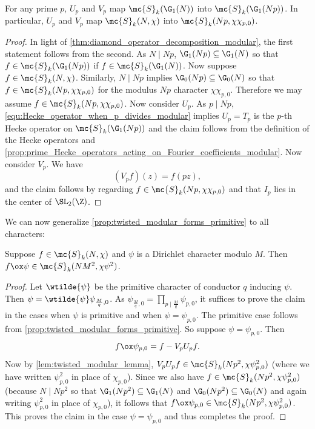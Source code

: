 \documentclass[12pt]{article}
\begin{document}
      \begin{lemma}\label{lem:twisted_modular_lemma}
        For any prime \(p\), \(U_{p}\) and \(V_{p}\) map \(\mc{S}_{k}(\G_{1}(N))\) into \(\mc{S}_{k}(\G_{1}(Np))\). In particular, \(U_{p}\) and \(V_{p}\) map \(\mc{S}_{k}(N,\chi)\) into \(\mc{S}_{k}(Np,\chi\chi_{p,0})\).
      \end{lemma}
      \begin{proof}
        In light of \cref{thm:diamond_operator_decomposition_modular}, the first statement follows from the second. As \(N \mid Np\), \(\G_{1}(Np) \subseteq \G_{1}(N)\) so that \(f \in \mc{S}_{k}(\G_{1}(Np))\) if \(f \in \mc{S}_{k}(\G_{1}(N))\). Now suppose \(f \in \mc{S}_{k}(N,\chi)\). Similarly, \(N \mid Np\) implies \(\G_{0}(Np) \subseteq \G_{0}(N)\) so that \(f \in \mc{S}_{k}(Np,\chi\chi_{p,0})\) for the modulus \(Np\) character \(\chi\chi_{p,0}\). Therefore we may assume \(f \in \mc{S}_{k}(Np,\chi\chi_{p,0})\). Now consider \(U_{p}\). As \(p \mid Np\), \cref{equ:Hecke_operator_when_p_divides_modular} implies \(U_{p} = T_{p}\) is the \(p\)-th Hecke operator on \(\mc{S}_{k}(\G_{1}(Np))\) and the claim follows from the definition of the Hecke operators and \cref{prop:prime_Hecke_operators_acting_on_Fourier_coefficients_modular}. Now consider \(V_{p}\). We have
        \[
          (V_{p}f)(z) = f(pz),
        \]
        and the claim follows by regarding \(f \in \mc{S}_{k}(Np,\chi\chi_{p,0})\) and that \(I_{p}\) lies in the center of \(\SL_{2}(\Z)\).
      \end{proof}

      We can now generalize \cref{prop:twisted_modular_forms_primitive} to all characters:

      \begin{proposition}\label{prop:twisted_modular_forms}
        Suppose \(f \in \mc{S}_{k}(N,\chi)\) and \(\psi\) is a Dirichlet character modulo \(M\). Then \(f \ox \psi \in \mc{S}_{k}(NM^{2},\chi\psi^{2})\).
      \end{proposition}
      \begin{proof}
        Let \(\wtilde{\psi}\) be the primitive character of conductor \(q\) inducing \(\psi\). Then \(\psi = \wtilde{\psi}\psi_{\frac{M}{q},0}\). As \(\psi_{\frac{M}{q},0} = \prod_{p \mid \frac{M}{q}}\psi_{p,0}\), it suffices to prove the claim in the cases when \(\psi\) is primitive and when \(\psi = \psi_{p,0}\). The primitive case follows from \cref{prop:twisted_modular_forms_primitive}. So suppose \(\psi = \psi_{p,0}\). Then
        \[
          f \ox \psi_{p,0} = f-V_{p}U_{p}f.
        \]
        Now by \cref{lem:twisted_modular_lemma}, \(V_{p}U_{p}f \in \mc{S}_{k}(Np^{2},\chi\psi_{p,0}^{2})\) (where we have written \(\psi_{p,0}^{2}\) in place of \(\chi_{p,0}\)). Since we also have \(f \in \mc{S}_{k}(Np^{2},\chi\psi_{p,0}^{2})\) (because \(N \mid Np^{2}\) so that \(\G_{1}(Np^{2}) \subseteq \G_{1}(N)\) and \(\G_{0}(Np^{2}) \subseteq \G_{0}(N)\) and again writing \(\psi_{p,0}^{2}\) in place of \(\chi_{p,0}\)), it follows that \(f \ox \psi_{p,0} \in \mc{S}_{k}(Np^{2},\chi\psi_{p,0}^{2})\). This proves the claim in the case \(\psi = \psi_{p,0}\) and thus completes the proof.
      \end{proof}
\end{document}
